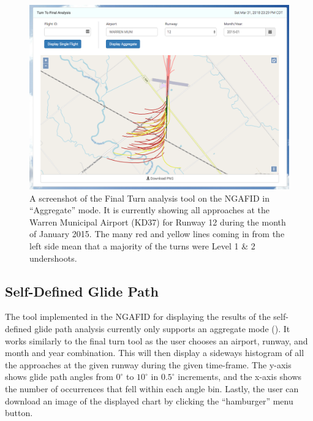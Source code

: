         \begin{figure}
    		\centering
            \includegraphics[width=\linewidth]{img/agg_ttf_screenshot}
            \caption{A screenshot of the Final Turn analysis tool on the NGAFID in ``Aggregate'' mode.  It is currently showing all approaches at the Warren Municipal Airport (KD37) for Runway 12 during the month of January 2015.  The many red and yellow lines coming in from the left side mean that a majority of the turns were Level 1 \& 2 undershoots.}
            \label{fig:agg_ttf_screenshot}
    	\end{figure}
    
    \subsection{Self-Defined Glide Path}
    
    	The tool implemented in the NGAFID for displaying the results of the self-defined glide path analysis currently only supports an aggregate mode ().  It works similarly to the final turn tool as the user chooses an airport, runway, and month and year combination.  This will then display a sideways histogram of all the approaches at the given runway during the given time-frame.  The y-axis shows glide path angles from $0^\circ$ to $10^\circ$ in $0.5^\circ$ increments, and the x-axis shows the number of occurrences that fell within each angle bin.  Lastly, the user can download an image of the displayed chart by clicking the ``hamburger'' menu button.
    
